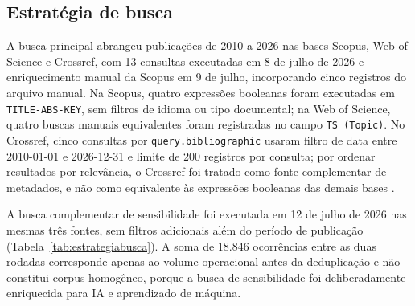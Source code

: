 \subsection{Estratégia de busca}

A busca principal abrangeu publicações de 2010 a 2026 nas bases Scopus, Web of Science e Crossref, com 13 consultas executadas em 8 de julho de 2026 e enriquecimento manual da Scopus em 9 de julho, incorporando cinco registros do arquivo manual. Na Scopus, quatro expressões booleanas foram executadas em \texttt{TITLE-ABS-KEY}, sem filtros de idioma ou tipo documental; na Web of Science, quatro buscas manuais equivalentes foram registradas no campo \texttt{TS (Topic)}. No Crossref, cinco consultas por \texttt{query.bibliographic} usaram filtro de data entre 2010-01-01 e 2026-12-31 e limite de 200 registros por consulta; por ordenar resultados por relevância, o Crossref foi tratado como fonte complementar de metadados, e não como equivalente às expressões booleanas das demais bases \parencite{crossref_restapi_2026}.

A busca complementar de sensibilidade foi executada em 12 de julho de 2026 nas mesmas três fontes, sem filtros adicionais além do período de publicação (Tabela~\ref{tab:estrategiabusca}). A soma de 18.846 ocorrências entre as duas rodadas corresponde apenas ao volume operacional antes da deduplicação e não constitui corpus homogêneo, porque a busca de sensibilidade foi deliberadamente enriquecida para IA e aprendizado de máquina.

